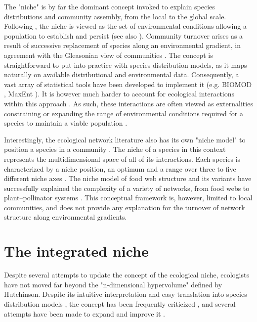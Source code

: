\documentclass[12pt]{article}
\begin{document}
The "niche" is by far the dominant concept invoked to explain species
distributions and community assembly, from the local to the global scale.
Following \citealt{Hutchinson1957}, the niche is viewed as the set of
environmental conditions allowing a population to establish and persist (see
also \citealt{Holt2009a}). Community turnover arises as a result of successive
replacement of species along an environmental gradient, in agreement with the
Gleasonian view of communities \citep{Gleason1926}. The concept is
straightforward to put into practice with species distribution models, as it
maps naturally on available distributional and environmental data.
Consequently, a vast array of statistical tools have been developed to
implement it (e.g. BIOMOD \citealt{Thuiller2003}, MaxEnt
\citealt{Phillips2006}). It is however much harder to account for ecological
interactions within this approach \citep{Peterson2011}. As such, these
interactions are often viewed as externalities constraining or expanding the
range of environmental conditions required for a species to maintain a viable
population \citep{Pulliam2000, Soberon2007}.

Interestingly, the ecological network literature also has its own "niche
model" to position a species in a community \citep{Williams2000a}. The niche of
a species in this context represents the multidimensional space of all of its
interactions. Each species is characterized by a niche position, an optimum
and a range over three to five different niche axes \citep{Williams2000a, Eklof2013}.
The niche model of food web structure and its variants have successfully
explained the complexity of a variety of networks, from food webs to
plant–pollinator systems \citep{Allesina2008, Williams2010, Eklof2013}. This
conceptual framework is, however, limited to local communities, and does not
provide any explanation for the turnover of network structure along
environmental gradients.

\section*{The integrated niche}

Despite several attempts to update the concept of the ecological niche,
ecologists have not moved far beyond the "n-dimensional hypervolume" defined
by Hutchinson. Despite its intuitive interpretation and easy translation into
species distribution models \citep{Boulangeat2012, Blonder2014}, the concept
has been frequently criticized \citep{Hardin1960, Peters1991, Silvertown2004},
and several attempts have been made to expand and improve it
\citep{Pulliam2000, Chase2003, Soberon2007, Holt2009a, McInerny2012b}.
\end{document}
